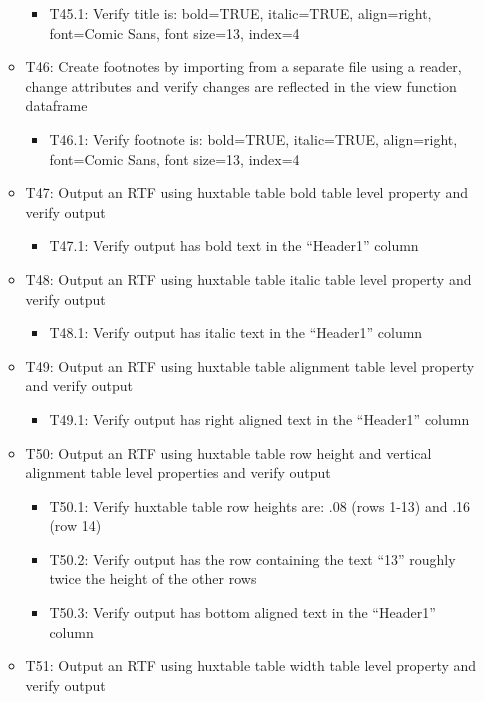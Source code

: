 \documentclass[]{article}
\providecommand{\tightlist}{%
  \setlength{\itemsep}{0pt}\setlength{\parskip}{0pt}}
\begin{document}
\begin{itemize}
\begin{itemize}
    \begin{itemize}
    \tightlist
    \item
      T45.1: Verify title is: bold=TRUE, italic=TRUE, align=right,
      font=Comic Sans, font size=13, index=4
    \end{itemize}
  \item
    T46: Create footnotes by importing from a separate file using a
    reader, change attributes and verify changes are reflected in the
    view function dataframe

    \begin{itemize}
    \tightlist
    \item
      T46.1: Verify footnote is: bold=TRUE, italic=TRUE, align=right,
      font=Comic Sans, font size=13, index=4
    \end{itemize}
  \item
    T47: Output an RTF using huxtable table bold table level property
    and verify output

    \begin{itemize}
    \tightlist
    \item
      T47.1: Verify output has bold text in the ``Header1'' column
    \end{itemize}
  \item
    T48: Output an RTF using huxtable table italic table level property
    and verify output

    \begin{itemize}
    \tightlist
    \item
      T48.1: Verify output has italic text in the ``Header1'' column
    \end{itemize}
  \item
    T49: Output an RTF using huxtable table alignment table level
    property and verify output

    \begin{itemize}
    \tightlist
    \item
      T49.1: Verify output has right aligned text in the ``Header1''
      column
    \end{itemize}
  \item
    T50: Output an RTF using huxtable table row height and vertical
    alignment table level properties and verify output

    \begin{itemize}
    \tightlist
    \item
      T50.1: Verify huxtable table row heights are: .08 (rows 1-13) and
      .16 (row 14)
    \item
      T50.2: Verify output has the row containing the text ``13''
      roughly twice the height of the other rows
    \item
      T50.3: Verify output has bottom aligned text in the ``Header1''
      column
    \end{itemize}
  \item
    T51: Output an RTF using huxtable table width table level property
    and verify output


\end{itemize}
\end{itemize}
\end{document}
